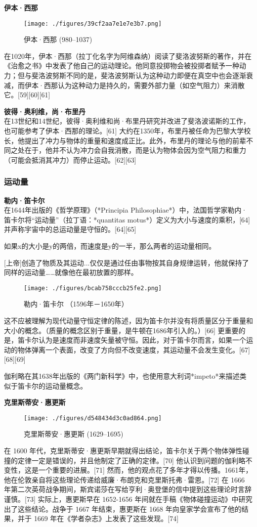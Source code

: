 \textbf{伊本·西那}\\
\begin{figure}[ht]
\centering
\texttt{[image: ./figures/39cf2aa7e1e7e3b7.png]}
\caption{伊本·西那 (980–1037)} \label{fig_DL_5}
\end{figure}
在1020年，伊本·西那（拉丁化名字为阿维森纳）阅读了斐洛波努斯的著作，并在《治愈之书》中发表了他自己的运动理论。他同意投掷物会被投掷者赋予一种动力；但与斐洛波努斯不同的是，斐洛波努斯认为这种动力即便在真空中也会逐渐衰减，而伊本·西那认为这种动力是持久的，需要外部力量（如空气阻力）来消散它。[59][60][61]

\textbf{彼得·奥利维，尚·布里丹}\\
在13世纪和14世纪，彼得·奥利维和尚·布里丹研究并改进了斐洛波诺斯的工作，也可能参考了伊本·西那的理论。[61] 大约在1350年，布里丹被任命为巴黎大学校长，他提出了冲力与物体的重量和速度成正比。此外，布里丹的理论与他的前辈不同之处在于，他并不认为冲力会自我消散，而是认为物体会因为空气阻力和重力（可能会抵消其冲力）而停止运动。[62][63]
\subsubsection{运动量}  
\textbf{勒内·笛卡尔}\\
在1644年出版的《哲学原理》（*Principia Philosophiae*）中，法国哲学家勒内·笛卡尔将“运动量”（拉丁语：*quantitas motus*）定义为大小与速度的乘积，[64]并声称宇宙中的总运动量是守恒的。[64][65]

 如果x的大小是y的两倍，而速度是y的一半，那么两者的运动量相同。

 [上帝]创造了物质及其运动...仅仅是通过任由事物按其自身规律运转，他就保持了同样的运动量……就像他在最初放置的那样。
\begin{figure}[ht]
\centering
\texttt{[image: ./figures/bcab758cccb25fe2.png]}
\caption{勒内·笛卡尔   （1596年－1650年）} \label{fig_DL_6}
\end{figure}
这不应被理解为现代动量守恒定律的陈述，因为笛卡尔并没有将质量区分于重量和大小的概念。（质量的概念区别于重量，是牛顿在1686年引入的。）[66] 更重要的是，笛卡尔认为是速度而非速度矢量被守恒。因此，对于笛卡尔而言，如果一个运动的物体弹离一个表面，改变了方向但不改变速度，其运动量不会发生变化。[67][68][69] 

伽利略在其1638年出版的《两门新科学》中，也使用意大利词*impeto*来描述类似于笛卡尔的运动量概念。

\textbf{克里斯蒂安·惠更斯}\\
\begin{figure}[ht]
\centering
\texttt{[image: ./figures/d548434d3c0ad864.png]}
\caption{克里斯蒂安·惠更斯   (1629–1695)} \label{fig_DL_7}
\end{figure}
在 1600 年代，克里斯蒂安·惠更斯早期就得出结论，笛卡尔关于两个物体弹性碰撞的定律一定是错误的，并且他制定了正确的定律。[70] 他认识到问题的伽利略不变性，这是一个重要的进展。[71] 然而，他的观点花了多年才得以传播。1661年，他在伦敦亲自将这些理论传递给威廉·布朗克和克里斯托弗·雷恩。[72] 在 1666 年第二次英荷战争期间，斯宾诺莎在写给亨利·奥登堡的信中提到这些理论时言辞谨慎。[73] 实际上，惠更斯早在 1652-1656 年间就在手稿《物体碰撞运动》中研究出了这些结论。战争于 1667 年结束，惠更斯在 1668 年向皇家学会宣布了他的结果，并于 1669 年在《学者杂志》上发表了这些发现。[74]
